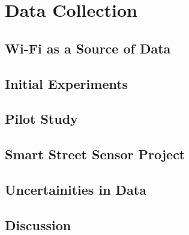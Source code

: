 \chapter{Data Collection}

\section{Wi-Fi as a Source of Data}

\section{Initial Experiments}

\section{Pilot Study}

\section{Smart Street Sensor Project}

\section{Uncertainities in Data}

\section{Discussion}

